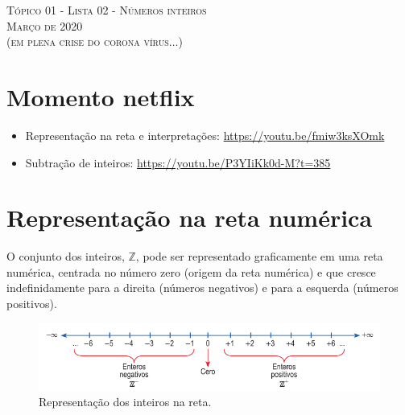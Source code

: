 \documentclass{exam}
\begin{document}
	\begin{center}
\large{\textsc{Tópico 01 - Lista 02 - Números inteiros\\
Março de 2020\\ (em plena crise do corona vírus$\ldots$)}}
	\end{center}

	
	\begin{multicols*}{2}
	\setlength{\columnseprule}{1pt}


\tableofcontents

\section{Momento netflix}

	\begin{itemize}
	
	\item Representação na reta e interpretações: \url{https://youtu.be/fmiw3ksXOmk}
	
	\item Subtração de inteiros: \url{https://youtu.be/P3YIiKk0d-M?t=385}
		
	\end{itemize}


\section{Representação na reta numérica}

O conjunto dos inteiros, $\mathbb{Z}$, pode ser representado graficamente em uma reta numérica, centrada no número zero (origem da reta numérica) e que cresce indefinidamente para a direita (números negativos) e para a esquerda (números positivos).

\begin{figure}[H]
	\centering
	\includegraphics[scale=0.45]{fig01}
	\caption{Representação dos inteiros na reta.}
	\label{fig:retaNumerica}
\end{figure}


\end{multicols*}
\end{document}
